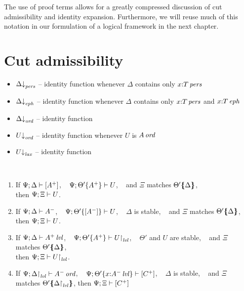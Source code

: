 The use of proof terms allows for a greatly compressed discussion of
cut admissibility and identity expansion. Furthermore, we will reuse
much of this notation in our formulation of a logical framework in the
next chapter. 

\section{Cut admissibility}
\label{sec:ord-cut}

\begin{itemize}
\item $\Delta{\downarrow}_{{\it pers}}$ -- identity function whenever $\Delta$ contains only $x{:}{T}\,{{\it pers}}$
\item $\Delta{\downarrow}_{{\it eph}}$ -- identity function whenever $\Delta$ contains only $x{:}{T}\,{{\it pers}}$ and $x{:}{T}\,{{\it eph}}$
\item $\Delta{\downarrow}_{{\it ord}}$ -- identity function
\end{itemize}

\begin{itemize}
\item $U{\downarrow}_{{\it ord}}$ -- identity function whenever $U$ is ${A}\,{{\it ord}}$
\item $U{\downarrow}_{{\it lax}}$ -- identity function
\end{itemize}






\begin{theorem}~
\begin{enumerate}
\item If ${\Psi};{\Delta} \vdash {[ A^+ ]}$, ~
         ${\Psi};{{\Theta'}\{{A^+}\}} \vdash {U}$, ~ and
         $\Xi$ matches ${\Theta'}\mbox{$\{\hspace{-4pt}\{$}{{\Delta}}\mbox{$\}\hspace{-4pt}\}$}$,\\
      then ${\Psi};{\Xi} \vdash {U}$.
\item If ${\Psi};{\Delta} \vdash {A^-}$, ~
         ${\Psi};{{\Theta'}\{{[A^-]}\}} \vdash {U}$, ~
         $\Delta$ is stable, ~ and
         $\Xi$ matches ${\Theta'}\mbox{$\{\hspace{-4pt}\{$}{\Delta}\mbox{$\}\hspace{-4pt}\}$}$,\\
      then ${\Psi};{\Xi} \vdash {U}$.
\item If ${\Psi};{\Delta} \vdash {{A^+}\,{{\it lvl}}}$, ~
         ${\Psi};{{\Theta'}\{{A^+}\}} \vdash {\ensuremath{{U}{\upharpoonright}_{{\it lvl}}}}$, ~
         $\Theta'$ and $U$ are stable, ~ and
         $\Xi$ matches ${\Theta'}\mbox{$\{\hspace{-4pt}\{$}{\Delta}\mbox{$\}\hspace{-4pt}\}$}$,\\
      then ${\Psi};{\Xi} \vdash {\ensuremath{{U}{\upharpoonright}_{{\it lvl}}}}$.
\item If ${\Psi};{{\Delta}{\upharpoonright}_{{\it lvl}}} \vdash {{A^-}\,{{\it ord}}}$, ~
         ${\Psi};{{\Theta'}\{{x{:}{A^-}\,{{\it lvl}}}\}} \vdash [{C^+}]$, ~
         $\Delta$ is stable, ~ and
         $\Xi$ matches ${\Theta'}\mbox{$\{\hspace{-4pt}\{$}{\ensuremath{{\Delta}{\upharpoonright}_{{\it lvl}}}}\mbox{$\}\hspace{-4pt}\}$}$,
      then ${\Psi};{\Xi} \vdash [{C^+}]$
\end{enumerate}
\end{theorem}

